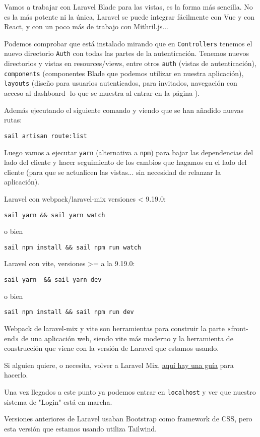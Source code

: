 \documentclass[11pt]{article}
\begin{document}
\begin{enumerate}
Vamos a trabajar con Laravel Blade para las vistas, es la forma más
sencilla. No es la más potente ni la única, Laravel se puede integrar
fácilmente con Vue y con React, y con un poco más de trabajo con
Mithril.js...


Podemos comprobar que está instalado mirando que en \texttt{Controllers}
tenemos el nuevo directorio \texttt{Auth} con todas las partes de la
autenticación. Tenemos nuevos directorios y vistas en resources/views,
entre otros \texttt{auth} (vistas de autenticación), \texttt{components}
(componentes Blade que podemos utilizar en nuestra aplicación),
\texttt{layouts} (diseño para usuarios autenticados, para invitados,
navegación con acceso al dashboard -lo que se muestra al entrar en la
página-).

Además ejecutando el siguiente comando y viendo que se han añadido
nuevas rutas:
\begin{verbatim}
sail artisan route:list
\end{verbatim}

Luego vamos a ejecutar \texttt{yarn} (alternativa a \texttt{npm}) para bajar las
dependencias del lado del cliente y hacer seguimiento de los cambios
que hagamos en el lado del cliente (para que se actualicen las
vistas... sin necesidad de relanzar la aplicación).

Laravel con webpack/laravel-mix versiones < 9.19.0:
\begin{verbatim}
sail yarn && sail yarn watch
\end{verbatim}
o bien
\begin{verbatim}
sail npm install && sail npm run watch
\end{verbatim}

Laravel con vite, versiones >= a la 9.19.0:
\begin{verbatim}
sail yarn  && sail yarn dev
\end{verbatim}
o bien
\begin{verbatim}
sail npm install && sail npm run dev
\end{verbatim}

Webpack de laravel-mix y vite son herramientas para construir la parte
«front-end» de una aplicación web, siendo vite más moderno y la
herramienta de construcción que viene con la versión de Laravel que
estamos usando.

Si alguien quiere, o necesita, volver a Laravel Mix, \href{https://github.com/laravel/vite-plugin/blob/main/UPGRADE.md\#migrating-from-vite-to-laravel-mix}{aquí hay una guía}
para hacerlo.

Una vez llegados a este punto ya podemos entrar en \texttt{localhost} y ver
que nuestro sistema de "Login" está en marcha.

Versiones anteriores de Laravel usaban Bootstrap como framework de
CSS, pero esta versión que estamos usando utiliza Tailwind.
\end{enumerate}
\end{document}

